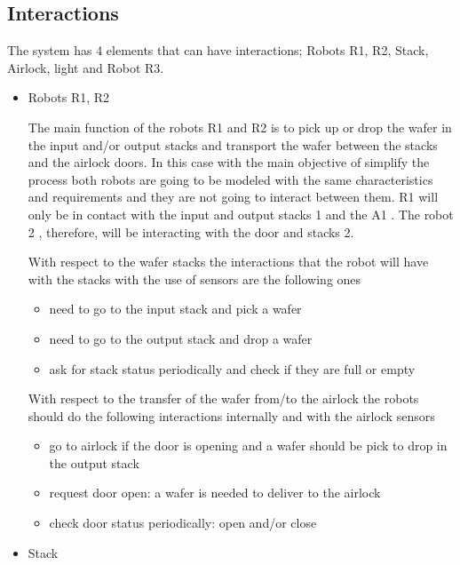 \documentclass[twocolumn]{article}
\begin{document}
\subsection{Interactions}
The system has 4 elements that can have interactions; Robots R1, R2, Stack, Airlock, light and Robot R3.
\begin{itemize}
\item Robots R1, R2


The main function of the robots R1 and R2 is to pick up or drop the wafer in the input and/or output stacks and transport the wafer between the stacks and the airlock doors.
In this case with the main objective of simplify the process both robots are going to be modeled with the same characteristics and requirements and they are not going to interact between them.  R1 will only be in contact with the input and output stacks 1 and the A1 .
The robot 2 , therefore, will be interacting with the door and stacks 2.


With respect to the wafer stacks the interactions that the robot will have with the stacks with the use of sensors are the following ones
\begin{itemize}
\item{ need to go to the input stack and pick a wafer} 
\item{need to go to the output stack and drop a wafer}
\item{ask for stack status periodically and check if they are full or empty}
\end{itemize}

With respect to the transfer of the wafer from/to the airlock the robots should do the following interactions internally and with the airlock sensors
\begin{itemize}
\item{go to airlock if the door is opening and a wafer should be pick to drop in the output stack }
\item{request door open: a wafer is needed to deliver to the airlock }
\item{check door status periodically: open and/or close}
\end{itemize}

\item Stack



\end{itemize}
\end{document}
